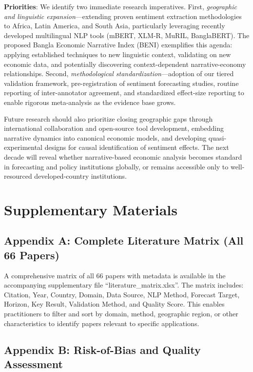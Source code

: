\documentclass[11pt,twocolumn]{article}
\begin{document}
\textbf{Priorities}: We identify two immediate research imperatives. First, \textit{geographic and linguistic expansion}---extending proven sentiment extraction methodologies to Africa, Latin America, and South Asia, particularly leveraging recently developed multilingual NLP tools (mBERT, XLM-R, MuRIL, BanglaBERT). The proposed Bangla Economic Narrative Index (BENI) exemplifies this agenda: applying established techniques to new linguistic context, validating on new economic data, and potentially discovering context-dependent narrative-economy relationships. Second, \textit{methodological standardization}---adoption of our tiered validation framework, pre-registration of sentiment forecasting studies, routine reporting of inter-annotator agreement, and standardized effect-size reporting to enable rigorous meta-analysis as the evidence base grows.

Future research should also prioritize closing geographic gaps through international collaboration and open-source tool development, embedding narrative dynamics into canonical economic models, and developing quasi-experimental designs for causal identification of sentiment effects. The next decade will reveal whether narrative-based economic analysis becomes standard in forecasting and policy institutions globally, or remains accessible only to well-resourced developed-country institutions.

\appendix

\section{Supplementary Materials}

\subsection*{Appendix A: Complete Literature Matrix (All 66 Papers)}

A comprehensive matrix of all 66 papers with metadata is available in the accompanying supplementary file ``literature\_matrix.xlsx''. The matrix includes: Citation, Year, Country, Domain, Data Source, NLP Method, Forecast Target, Horizon, Key Result, Validation Method, and Quality Score. This enables practitioners to filter and sort by domain, method, geographic region, or other characteristics to identify papers relevant to specific applications.

\subsection*{Appendix B: Risk-of-Bias and Quality Assessment}
\end{document}
